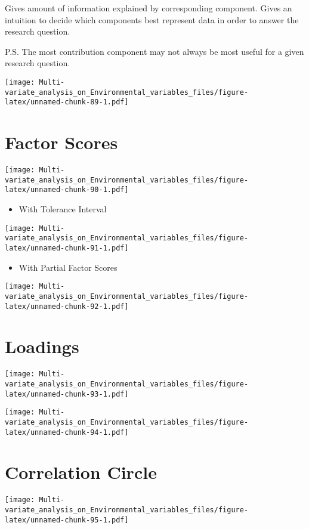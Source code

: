 \documentclass[]{book}
\providecommand{\tightlist}{%
  \setlength{\itemsep}{0pt}\setlength{\parskip}{0pt}}
\begin{document}
Gives amount of information explained by corresponding component. Gives
an intuition to decide which components best represent data in order to
answer the research question.

P.S. The most contribution component may not always be most useful for a
given research question.

\texttt{[image: Multi-variate\_analysis\_on\_Environmental\_variables\_files/figure-latex/unnamed-chunk-89-1.pdf]}

\hypertarget{factor-scores-4}{%
\section{Factor Scores}\label{factor-scores-4}}

\texttt{[image: Multi-variate\_analysis\_on\_Environmental\_variables\_files/figure-latex/unnamed-chunk-90-1.pdf]}

\begin{itemize}
\tightlist
\item
  With Tolerance Interval
\end{itemize}

\texttt{[image: Multi-variate\_analysis\_on\_Environmental\_variables\_files/figure-latex/unnamed-chunk-91-1.pdf]}

\begin{itemize}
\tightlist
\item
  With Partial Factor Scores
\end{itemize}

\texttt{[image: Multi-variate\_analysis\_on\_Environmental\_variables\_files/figure-latex/unnamed-chunk-92-1.pdf]}

\hypertarget{loadings-4}{%
\section{Loadings}\label{loadings-4}}

\texttt{[image: Multi-variate\_analysis\_on\_Environmental\_variables\_files/figure-latex/unnamed-chunk-93-1.pdf]}

\texttt{[image: Multi-variate\_analysis\_on\_Environmental\_variables\_files/figure-latex/unnamed-chunk-94-1.pdf]}

\hypertarget{correlation-circle-1}{%
\section{Correlation Circle}\label{correlation-circle-1}}

\texttt{[image: Multi-variate\_analysis\_on\_Environmental\_variables\_files/figure-latex/unnamed-chunk-95-1.pdf]}
\end{document}
